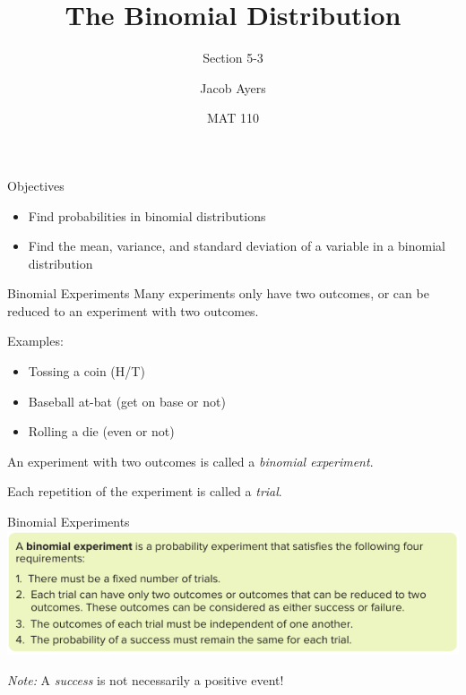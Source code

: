 \documentclass[t, aspectratio=169]{beamer}
\title[5-3]{The Binomial Distribution}
\subtitle{Section 5-3}
\author{Jacob Ayers}
\institute{Lesson \#16}
\date{MAT 110}
\newcommand{\?}{\stackrel{?}{=}}
\begin{document}
	
	\begin{frame}
		\titlepage
	\end{frame}
	
	\begin{frame}{Objectives}
		\begin{itemize}
			\item Find probabilities in binomial distributions
			\item Find the mean, variance, and standard deviation of a variable in a binomial distribution
		\end{itemize}
	\end{frame}

	\begin{frame}{Binomial Experiments}
		Many experiments only have two outcomes, or can be reduced to an experiment with two outcomes. \pause
		
		Examples: \begin{itemize}
			\item Tossing a coin (H/T) \pause
			\item Baseball at-bat (get on base or not) \pause
			\item Rolling a die (even or not) \pause
		\end{itemize}
	
		An experiment with two outcomes is called a \textit{binomial experiment}. \pause
		
		Each repetition of the experiment is called a \textit{trial}.
	\end{frame}

	\begin{frame}{Binomial Experiments}
		\includegraphics[width=\textwidth]{binom-exp.png} \pause
		
		\textit{Note:} A \textit{success} is not necessarily a positive event!
	\end{frame}
\end{document}
